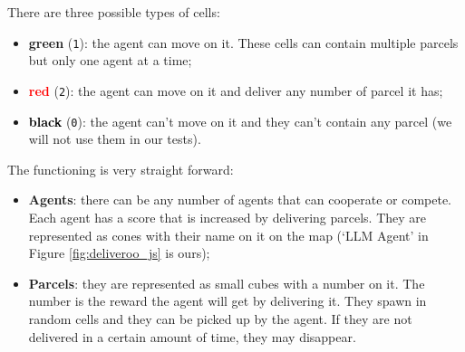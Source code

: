 There are three possible types of cells:
\begin{itemize}
  \item \textcolor{primary}{\textbf{green}} (\texttt{1}): the agent can move on
    it. These cells can contain multiple parcels but only one agent at a time;

  \item \textcolor{red}{\textbf{red}} (\texttt{2}): the agent can move on it and
    deliver any number of parcel it has;

  \item \textcolor{black}{\textbf{black}} (\texttt{0}): the agent can't move on
    it and they can't contain any parcel (we will not use them in our tests).
\end{itemize}

The functioning is very straight forward:

\begin{itemize}
  \item \textbf{Agents}: there can be any number of agents that can cooperate or
    compete. Each agent has a score that is increased by delivering parcels. They
    are represented as cones with their name on it on the map (`LLM Agent' in
    Figure \ref{fig:deliveroo_js} is ours);

  \item \textbf{Parcels}: they are represented as small cubes with a number on it.
    The number is the reward the agent will get by delivering it. They spawn in random
    cells and they can be picked up by the agent. If they are not delivered in a
    certain amount of time, they may disappear.
\end{itemize}


